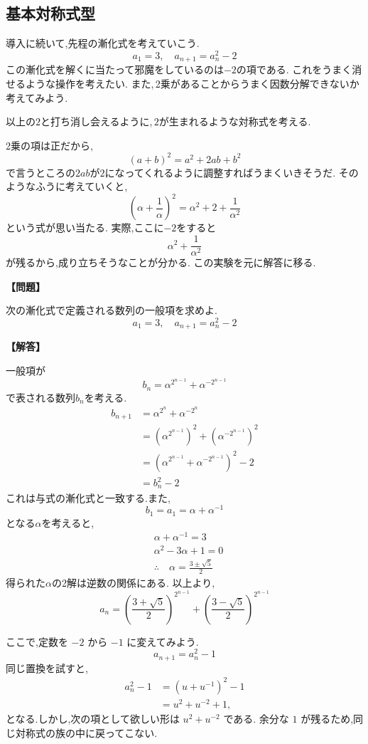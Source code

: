 \subsection{基本対称式型}
導入に続いて,先程の漸化式を考えていこう.
\[
  a_1=3, \quad a_{n+1}=a_n^2-2
\]
この漸化式を解くに当たって邪魔をしているのは$-2$の項である.
これをうまく消せるような操作を考えたい.
また,\,2乗があることからうまく因数分解できないか考えてみよう.

以上の$2$と打ち消し会えるように,\,$2$が生まれるような対称式を考える.

2乗の項は正だから,
\[
  (a+b)^2=a^2+2ab+b^2
\]
で言うところの$2ab$が$2$になってくれるように調整すればうまくいきそうだ.
そのようなふうに考えていくと,
\[
  \left(\alpha+\frac{1}{\alpha}\right)^2=\alpha^2+2+\frac{1}{\alpha^2}
\]
という式が思い当たる.
実際,ここに$-2$をすると
\[
  \alpha^2+\frac{1}{\alpha^2}
\]
が残るから,成り立ちそうなことが分かる.
この実験を元に解答に移る.

\noindent \textbf{【問題】}
\begin{smallquote}
  次の漸化式で定義される数列の一般項を求めよ.
  \[
    a_1=3, \quad a_{n+1}=a_n^2-2
  \]
\end{smallquote}
\textbf{【解答】}
  \begin{smallquote}
  一般項が
    \[
      b_n=\alpha^{2^{n-1}}+\alpha^{-2^{n-1}}
    \]
    で表される数列$b_n$を考える.
    \begin{align*}
      b_{n+1}&=\alpha^{2^{n}}+\alpha^{-2^{n}}\\
      &=\left(\alpha^{2^{n-1}}\right)^2+\left(\alpha^{-2^{n-1}}\right)^2\\
      &=\left(\alpha^{2^{n-1}}+\alpha^{-2^{n-1}}\right)^2-2\\
      &=b_n^2-2
    \end{align*}
    これは与式の漸化式と一致する.また,
    \[
      b_1=a_1=\alpha+\alpha^{-1}
    \]
    となる$\alpha$を考えると,
    \begin{align*}
      &\alpha+\alpha^{-1}=3\\
      &\alpha^2-3\alpha+1=0\\
      &\therefore \quad \alpha=\frac{3\pm \sqrt{5}}{2}
    \end{align*}
    得られた$\alpha$の2解は逆数の関係にある.
    以上より,
    \[
      a_n=\left(\frac{3+ \sqrt{5}}{2}\right)^{2^{n-1}}+\left(\frac{3- \sqrt{5}}{2}\right)^{2^{n-1}}
    \]
  \end{smallquote}

ここで,定数を $-2$ から $-1$ に変えてみよう.
\[
  a_{n+1}=a_n^2-1
\]
同じ置換を試すと,
\begin{align*}
  a_n^2-1
    &=\left(u+u^{-1}\right)^2-1\\
    &=u^2+u^{-2}+1,
\end{align*}
となる.しかし,次の項として欲しい形は $u^2+u^{-2}$ である.
余分な $1$ が残るため,同じ対称式の族の中に戻ってこない.

